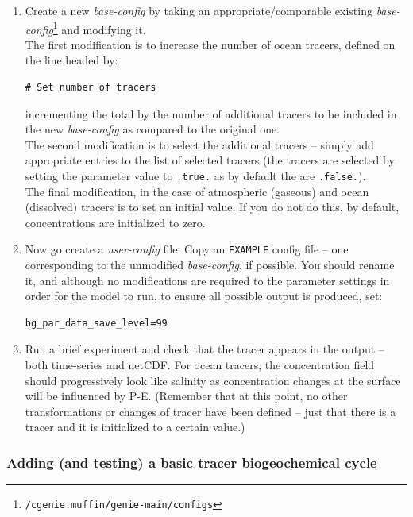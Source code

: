 \documentclass[11pt,fleqn]{book} %
\begin{document}
\begin{enumerate}
\item 
Create a new \textit{base-config} by taking an appropriate/comparable existing \textit{base-config}\footnote{\texttt{/cgenie.muffin/genie-main/configs}} and modifying it.
\\The first modification is to increase the number of ocean tracers, defined on the line headed by:
\vspace{-10pt}\begin{verbatim}
# Set number of tracers
\end{verbatim}\vspace{-10pt}
incrementing the total by the number of additional tracers to be included in the new \textit{base-config} as compared to the original one.
\\The second modification is to select the additional tracers -- simply add appropriate entries to the list of selected tracers (the tracers are selected by setting the parameter value to \texttt{.true.} as by default the are \texttt{.false.}).
\\The final modification, in the case of atmospheric (gaseous) and  ocean (dissolved) tracers is to set an initial value. If you do not do this, by default, concentrations are initialized to zero.
\item
Now go create a \textit{user-config} file. Copy an \texttt{EXAMPLE} config file -- one corresponding to the unmodified \textit{base-config}, if possible. You should rename it, and although no modifications are required to the parameter settings in order for the model to run, to ensure all possible output is produced, set:
\vspace{-10pt}\begin{verbatim}
bg_par_data_save_level=99
\end{verbatim}\vspace{-10pt}
\item
Run a brief experiment and check that the tracer appears in the output -- both time-series and netCDF. For ocean tracers, the concentration field should progressively look like salinity as concentration changes at the surface will be influenced by P-E. (Remember that at this point, no other transformations or changes of tracer have been defined -- just that there is a tracer and it is initialized to a certain value.)
\end{enumerate}

%
\subsubsection{Adding (and testing) a basic tracer biogeochemical cycle}
\end{document}
